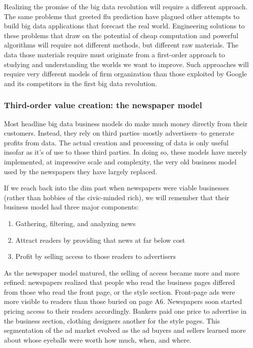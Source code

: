 \documentclass[12pt]{article}
\begin{document}
Realizing the promise of the big data revolution will require
a different approach. The same problems that greeted flu prediction
have plagued other attempts to build big data applications that
forecast the real world. Engineering solutions to these problems that
draw on the potential of cheap computation and powerful algorithms
will require not different methods, but different raw materials. The
data those materials require must originate from a first-order
approach to studying and understanding the worlds we want to
improve. Such approaches will require very different models of firm
organization than those exploited by Google and its competitors in the
first big data revolution.


\subsubsection{Third-order value creation: the newspaper model}
\label{sec:third-order-value}

Most headline big data business models do make much money directly from
their customers. Instead, they rely on third parties--mostly
advertisers--to generate profits from data. The actual creation and
processing of data is only useful insofar as it's of use to those
third parties. In doing so, these models have merely implemented, at
impressive scale and complexity, the very old business model used by
the newspapers they have largely replaced.

If we reach back into the dim past when newspapers were viable
businesses (rather than hobbies of the civic-minded rich), we will
remember that their business model had three major components:

\begin{enumerate}
\item Gathering, filtering, and analyzing news
\item Attract readers by providing that news at far below cost
\item Profit by selling access to those readers to advertisers
\end{enumerate}

As the newspaper model matured, the selling of access became more and
more refined: newspapers realized that people who read the business
pages differed from those who read the front page, or the style
section. Front-page ads were more visible to readers than those buried
on page A6. Newspapers soon started pricing access to their readers
accordingly. Bankers paid one price to advertise in the business
section, clothing designers another for the style pages. This
segmentation of the ad market evolved as the ad buyers and sellers
learned more about whose eyeballs were worth how much, when, and
where.
\end{document}
